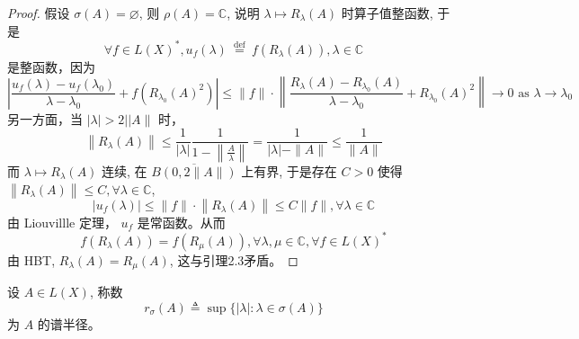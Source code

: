 \documentclass[lang=cn,newtx,10pt,scheme=chinese,thmcnt=chapter]{elegantbook}
\begin{document}
\begin{proof}
假设 $\sigma(A)=\varnothing$, 则 $\rho(A)= \mathbb{C}$, 说明 $\lambda \mapsto R_\lambda(A)$ 时算子值整函数, 于是
\begin{equation*}
\forall f \in L (X)^*, u_f(\lambda) \stackrel{\text { def }}{=} f\left(R_\lambda(A)\right), \lambda \in \mathbb{C}
\end{equation*}
是整函数，因为
\begin{equation*}
\left|\frac{u_f(\lambda)-u_f\left(\lambda_0\right)}{\lambda-\lambda_0}+f\left(R_{\lambda_0}(A)^2\right)\right| \leqslant\|f\| \cdot\left\|\frac{R_\lambda(A)-R_{\lambda_0}(A)}{\lambda-\lambda_0}+R_{\lambda_0}(A)^2\right\| \rightarrow 0 \text { as } \lambda \rightarrow \lambda_0
\end{equation*}
另一方面，当 $|\lambda|>2| | A \|$ 时，
\begin{equation*}
\left\|R_\lambda(A)\right\| \leqslant \frac{1}{|\lambda|} \frac{1}{1-\left\|\frac{A}{\lambda}\right\|}=\frac{1}{|\lambda|-\|A\|} \leqslant \frac{1}{\|A\|}
\end{equation*}
而 $\lambda \mapsto R_\lambda(A)$ 连续, 在 $\overline{ B(0,2\|A\|)}$ 上有界, 于是存在 $C>0$ 使得 $\left\|R_\lambda(A)\right\| \leqslant C, \forall \lambda \in \mathbb{C}$,
\begin{equation*}
\left|u_f(\lambda)\right| \leqslant\|f\| \cdot\left\|R_\lambda(A)\right\| \leqslant C\|f\|, \forall \lambda \in \mathbb{C}
\end{equation*}
由 Liouvillle 定理， $u_f$ 是常函数。从而
\begin{equation*}
f\left(R_\lambda(A)\right)=f\left(R_\mu(A)\right), \forall \lambda, \mu \in \mathbb{C} , \forall f \in L (X)^*
\end{equation*}
由 HBT, $R_\lambda(A)=R_\mu(A)$, 这与引理2.3矛盾。
\end{proof}

\begin{definition}
设 $A \in L(X)$, 称数
\[
r_\sigma(A) \triangleq \sup \{ |\lambda| : \lambda \in \sigma(A) \}
\]
为 $A$ 的谱半径。
\end{definition}
\end{document}
